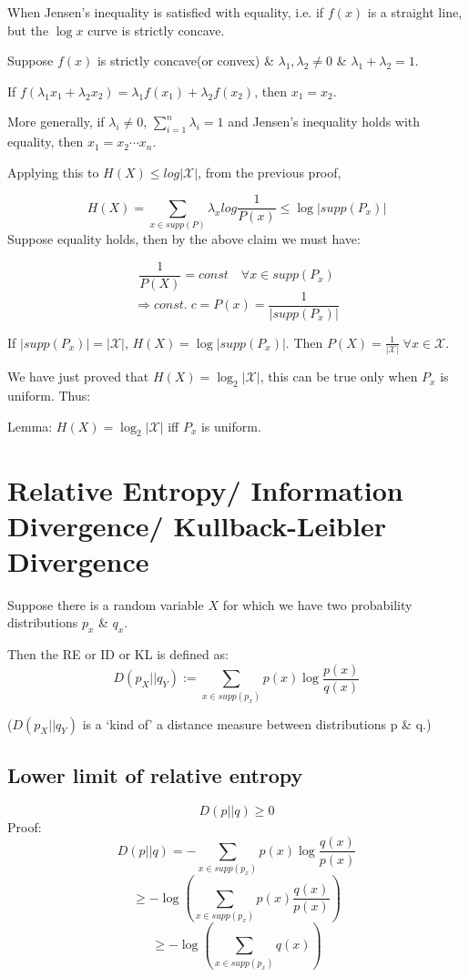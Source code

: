 \documentclass{article}
\begin{document}
When Jensen's inequality is satisfied with equality, i.e. if $f(x)$ is a straight line, but the $\log x$ curve is strictly concave.

Suppose $f(x)$ is strictly concave(or convex) \& $\lambda_1, \lambda_2 \neq 0$ \& $\lambda_1+\lambda_2=1$.

If $f(\lambda_1 x_1 + \lambda_2 x_2)=\lambda_1 f(x_1) + \lambda_2 f(x_2)$, then $x_1=x_2$.

More generally, if $\lambda_i \neq 0 $, $\sum_{i=1}^{n} \lambda_i=1$ and Jensen's inequality holds with equality, then $x_1=x_2\cdots x_n$.

Applying this to $H(X) \leq log|\mathcal X|$, from the previous proof,

$$ H(X)= \sum_{x \in supp(P)} \lambda_x log\frac{1}{P(x)} \leq \log |supp(P_x)| $$
Suppose equality holds, then by the above claim we must have:

$$ \frac{1}{P(X)}= const \quad \forall x \in supp(P_x)$$
$$ \Rightarrow const.\; c= P(x)= \frac{1}{|supp(P_x)|}$$

If $|supp(P_x)|=|\mathcal X|$, $H(X)= \log |supp(P_x)|$. Then $P(X)= \frac{1}{|\mathcal X|}\; \forall x \in \mathcal X$.

We have just proved that $H(X)= \log_2 |\mathcal X|$, this can be true only when $P_x$ is uniform. Thus:

Lemma:
$ H(X)= \log_2 |\mathcal X| $ iff $P_x$ is uniform.

\section{Relative Entropy/ Information Divergence/ Kullback-Leibler Divergence}

Suppose there is a random variable $X$ for which we have two probability distributions $p_x$ \& $q_x$.

Then the RE or ID or KL is defined as:
$$ D(p_X || q_Y):=\sum_{x \in supp(p_x)} p(x)\log \frac{p(x)}{q(x)}$$

($D(p_X || q_Y)$ is a `kind of' a distance measure between distributions p \& q.)

\subsection{Lower limit of relative entropy}
$$ D(p||q)\geq 0$$
Proof:
$$D(p || q)=-\sum_{x \in supp(p_x)} p(x)\log \frac{q(x)}{p(x)}$$
$$ \geq - \log \left(\sum_{x \in supp(p_x)} p(x) \frac{q(x)}{p(x)} \right)$$
$$ \geq - \log\left(\sum_{x \in supp(p_x)} q(x)\right)$$
\end{document}

